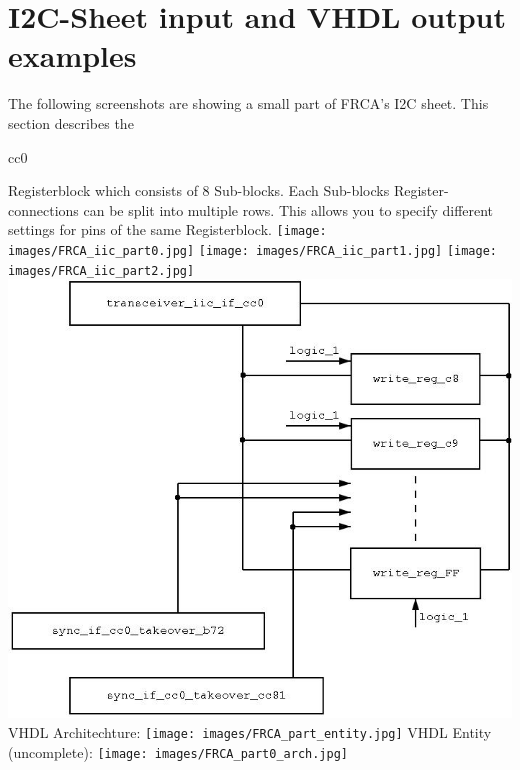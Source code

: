 \documentclass[a4paper,12pt]{report}
\begin{document}
\section{I2C-Sheet input and VHDL output examples}
The following screenshots are showing a small part of  FRCA's I2C sheet. This section describes the \begin{tt}cc0\end{tt} Registerblock which consists of 8 Sub-blocks. Each Sub-blocks Register-connections can be split into multiple rows. This allows you to specify different settings for pins of the same Registerblock.\newline
\newline
\texttt{[image: images/FRCA\_iic\_part0.jpg]}\newline
\newline
\texttt{[image: images/FRCA\_iic\_part1.jpg]}\newline
\newline
\texttt{[image: images/FRCA\_iic\_part2.jpg]}\newline
\newline
\includegraphics[scale=0.6]{images/FRCA_iic_block.jpg}\newline
\newpage
VHDL Architechture:\newline
\texttt{[image: images/FRCA\_part\_entity.jpg]}\newline
\newpage
VHDL Entity (uncomplete):\newline
\texttt{[image: images/FRCA\_part0\_arch.jpg]}\newline
\end{document}
